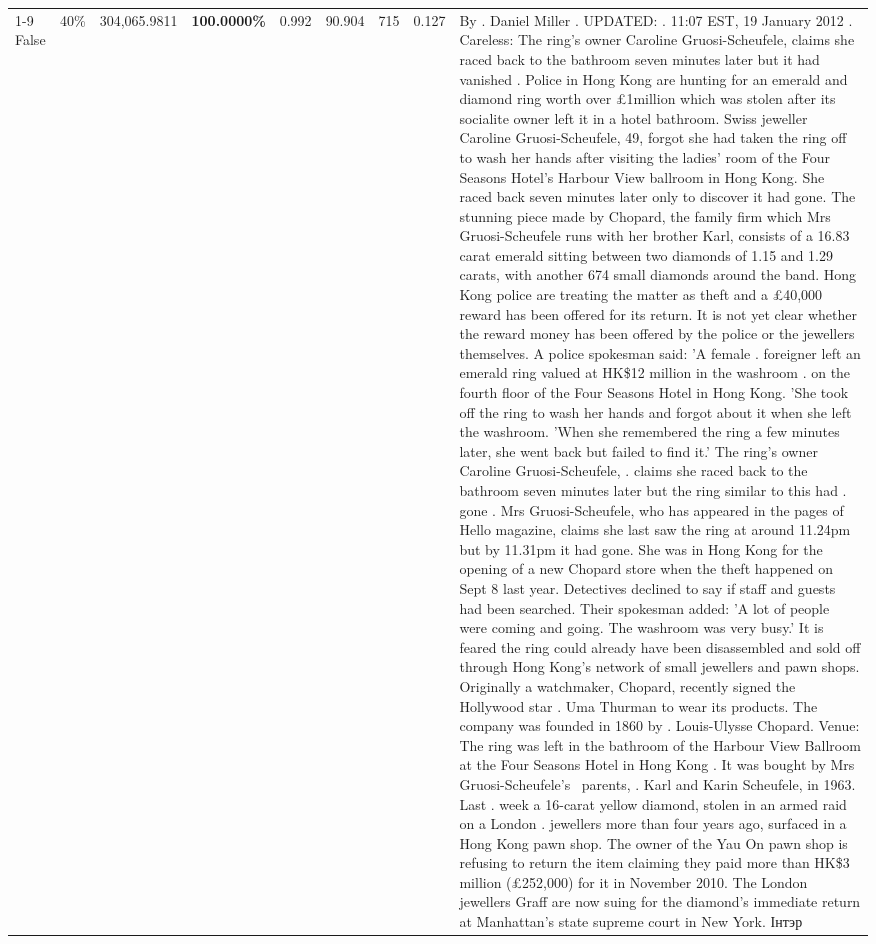 \begin{table}[H]
\begin{tabular}{lllrlllll}
\cline{1-9} \cline{2-9}
False & 40\% & \color{red} 304,065.9811 & \bfseries \color{red} 100.0000\% & 0.992 & 90.904 & 715 & 0.127 & By . Daniel Miller . UPDATED: . 11:07 EST, 19 January 2012 . Careless: The ring's owner Caroline Gruosi-Scheufele, claims she raced back to the bathroom seven minutes later but it had vanished . Police in Hong Kong are hunting for an emerald and diamond ring worth over £1million which was stolen after its socialite owner left it in a hotel bathroom. Swiss jeweller Caroline Gruosi-Scheufele, 49, forgot she had taken the ring off to wash her hands after visiting the ladies' room of the Four Seasons Hotel's Harbour View ballroom in Hong Kong. She raced back seven minutes later only to discover it had gone. The stunning piece made by Chopard, the family firm which Mrs Gruosi-Scheufele runs with her brother Karl, consists of a 16.83 carat emerald sitting between two diamonds of 1.15 and 1.29 carats, with another 674 small diamonds around the band. Hong Kong police are treating the matter as theft and a £40,000 reward has been offered for its return. It is not yet clear whether the reward money has been offered by the police or the jewellers themselves. A police spokesman said: 'A female . foreigner left an emerald ring valued at HK\$12 million in the washroom . on the fourth floor of the Four Seasons Hotel in Hong Kong. 'She took off the ring to wash her hands and forgot about it when she left the washroom. 'When she remembered the ring a few minutes later, she went back but failed to find it.' The ring's owner Caroline Gruosi-Scheufele, . claims she raced back to the bathroom seven minutes later but the ring similar to this had . gone . Mrs Gruosi-Scheufele, who has appeared in the pages of Hello magazine, claims she last saw the ring at around 11.24pm but by 11.31pm it had gone. She was in Hong Kong for the opening of a new Chopard store when the theft happened on Sept 8 last year. Detectives declined to say if staff and guests had been searched. Their spokesman added: 'A lot of people were coming and going. The washroom was very busy.' It is feared the ring could already have been disassembled and sold off through Hong Kong's network of small jewellers and pawn shops. Originally a watchmaker, Chopard, recently signed the Hollywood star . Uma Thurman to wear its products. The company was founded in 1860 by . Louis-Ulysse Chopard. Venue: The ring was left in the bathroom of the Harbour View Ballroom at the Four Seasons Hotel in Hong Kong . It was bought by Mrs Gruosi-Scheufele's  parents, . Karl and Karin Scheufele, in 1963. Last . week a 16-carat yellow diamond, stolen in an armed raid on a London . jewellers more than four years ago, surfaced in a Hong Kong pawn shop. The owner of the Yau On pawn shop is refusing to return the item claiming they paid more than HK\$3 million (£252,000) for it in November 2010. The London jewellers Graff are now suing for the diamond’s immediate return at Manhattan’s state supreme court in New York. Інтэр \\

\end{tabular}
\end{table}

